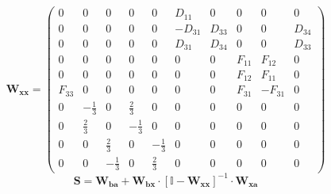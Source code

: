 \[ \mathbf{W_{xx}} = \left(\begin{smallmatrix} 0 & 0 & 0 & 0 & 0 &
D_{11} & 0 & 0 & 0 & 0 \\ 0 & 0 & 0 & 0 & 0 & -D_{31} & D_{33} & 0 & 0
& D_{34} \\ 0 & 0 & 0 & 0 & 0 & D_{31} & D_{34} & 0 & 0 & D_{33} \\ 0
& 0 & 0 & 0 & 0 & 0 & 0 & F_{11} & F_{12} & 0 \\ 0 & 0 & 0 & 0 & 0 & 0
& 0 & F_{12} & F_{11} & 0 \\ F_{33} & 0 & 0 & 0 & 0 & 0 & 0 & F_{31} &
-F_{31} & 0 \\ 0 & -\frac{1}{3} & 0 & \frac{2}{3} & 0 & 0 & 0 & 0 & 0
& 0 \\ 0 & \frac{2}{3} & 0 & -\frac{1}{3} & 0 & 0 & 0 & 0 & 0 & 0 \\ 0
& 0 & \frac{2}{3} & 0 & -\frac{1}{3} & 0 & 0 & 0 & 0 & 0 \\ 0 & 0 &
-\frac{1}{3} & 0 & \frac{2}{3} & 0 & 0 & 0 & 0 & 0
\end{smallmatrix}\right) \]
\[ \mathbf{S}=\mathbf{W_{ba}}+\mathbf{W_{bx}}\cdot\left[ \mathbb{I}
-\mathbf{W_{xx}}\right]^{-1}\cdot\mathbf{W_{xa}} \]
